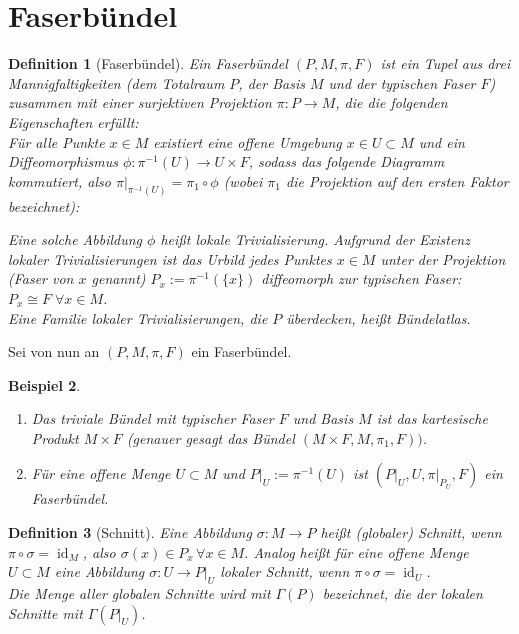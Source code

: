 \documentclass[a4paper]{scrreprt}
\numberwithin{equation}{chapter}
\DeclareMathOperator{\id}{id}
\theoremstyle{plain}
\newtheorem{defn}{Definition}[section]
\newtheorem{bsp}[defn]{Beispiel}
\begin{document}
	\section{Faserbündel}
		\begin{defn}[Faserbündel]
			Ein Faserbündel $(P,M,\pi ,F)$ ist ein Tupel aus drei Mannigfaltigkeiten (dem Totalraum $P$, der Basis $M$ und der typischen Faser $F$) zusammen mit einer surjektiven Projektion $\pi:P\rightarrow M$, die die folgenden Eigenschaften erfüllt:\\
				Für alle Punkte $x\in M$ existiert eine offene Umgebung $x\in U\subset M$ und ein Diffeomorphismus $\phi:\pi^{-1}(U)\rightarrow U\times F$, sodass das folgende Diagramm kommutiert, also $\pi\vert_{\pi^{-1}(U)}=\pi_1\circ\phi$ (wobei $\pi_1$ die Projektion auf den ersten Faktor bezeichnet):
			\begin{center}
			\end{center}
			Eine solche Abbildung $\phi$ heißt lokale Trivialisierung. Aufgrund der Existenz lokaler Trivialisierungen ist das Urbild jedes Punktes $x\in M$ unter der Projektion (Faser von $x$ genannt) $P_x:=\pi^{-1}(\lbrace x\rbrace )$ diffeomorph zur typischen Faser: $P_x\cong F \; \forall x\in M$.\\ 
			Eine Familie lokaler Trivialisierungen, die $P$ überdecken, heißt Bündelatlas. 
		\end{defn}
		Sei von nun an $(P,M,\pi ,F)$ ein Faserbündel.
		\begin{bsp}\hfill
			\begin{enumerate}
				\item Das triviale Bündel mit typischer Faser $F$ und Basis $M$ ist das kartesische Produkt $M\times F$ (genauer gesagt das Bündel $(M\times F,M,\pi_1,F))$.
				\item Für eine offene Menge $U\subset M$ und $P\vert_U:=\pi^{-1}(U)$ ist $(P\vert_U,U,\pi\vert_{P_U},F)$ ein Faserbündel.
			\end{enumerate}
		\end{bsp}
		\begin{defn}[Schnitt]
			Eine Abbildung $\sigma:M\rightarrow P$ heißt (globaler) Schnitt, wenn $\pi\circ\sigma=\id_M$, also $\sigma(x)\in P_x\, \forall x\in M$. Analog heißt für eine offene Menge $U\subset M$ eine Abbildung $\sigma:U\rightarrow P\vert_U$ lokaler Schnitt, wenn $\pi\circ\sigma=\id_U$.\\
			Die Menge aller globalen Schnitte wird mit $\Gamma(P)$ bezeichnet, die der lokalen Schnitte mit $\Gamma(P\vert_U)$.
		\end{defn}
\end{document}
